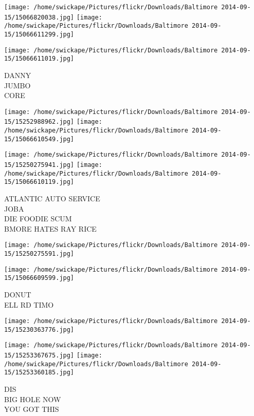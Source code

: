 \documentclass[10pt,letterpaper]{article}
\begin{document}
\texttt{[image: /home/swickape/Pictures/flickr/Downloads/Baltimore 2014-09-15/15066820038.jpg]}
\texttt{[image: /home/swickape/Pictures/flickr/Downloads/Baltimore 2014-09-15/15066611299.jpg]}

\vspace{0.25in}
\texttt{[image: /home/swickape/Pictures/flickr/Downloads/Baltimore 2014-09-15/15066611019.jpg]}

DANNY\\
JUMBO\\
CORE\\
\pagebreak

\texttt{[image: /home/swickape/Pictures/flickr/Downloads/Baltimore 2014-09-15/15252988962.jpg]}
\texttt{[image: /home/swickape/Pictures/flickr/Downloads/Baltimore 2014-09-15/15066610549.jpg]}

\texttt{[image: /home/swickape/Pictures/flickr/Downloads/Baltimore 2014-09-15/15250275941.jpg]}
\texttt{[image: /home/swickape/Pictures/flickr/Downloads/Baltimore 2014-09-15/15066610119.jpg]}

ATLANTIC AUTO SERVICE\\
JOBA\\
DIE FOODIE SCUM\\
BMORE HATES RAY RICE\\
\pagebreak

\texttt{[image: /home/swickape/Pictures/flickr/Downloads/Baltimore 2014-09-15/15250275591.jpg]}

\vspace{0.25in}
\texttt{[image: /home/swickape/Pictures/flickr/Downloads/Baltimore 2014-09-15/15066609599.jpg]}

DONUT\\
ELL RD TIMO\\
\pagebreak

\texttt{[image: /home/swickape/Pictures/flickr/Downloads/Baltimore 2014-09-15/15230363776.jpg]}

\vspace{0.25in}
\texttt{[image: /home/swickape/Pictures/flickr/Downloads/Baltimore 2014-09-15/15253367675.jpg]}
\texttt{[image: /home/swickape/Pictures/flickr/Downloads/Baltimore 2014-09-15/15253360185.jpg]}

DIS\\
BIG HOLE NOW\\
YOU GOT THIS\\
\pagebreak
\end{document}
